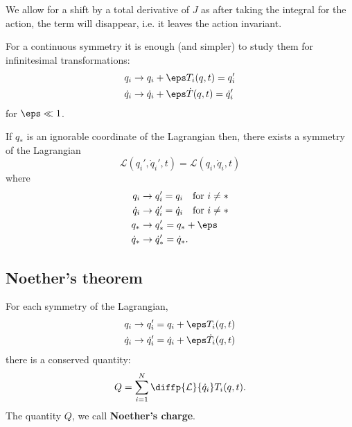 \documentclass[12pt, a4paper]{article}
\newcommand{\LL}{\mathcal L}
\begin{document}
\begin{mdremark}
    We allow for a shift by a total derivative of \(J\) as after taking the integral for the action, the term will disappear, i.e. it leaves the action invariant.
\end{mdremark}

\begin{proposition}
    For a continuous symmetry it is enough (and simpler) to study them for infinitesimal transformations:
    \[\begin{aligned}
        q_i &\to q_i +\eps T_i(q,t) =q'_i  \\
        \dot{q}_i &\to \dot{q}_i+\eps\dot{T}(q,t) =\dot{q}'_i
    \end{aligned}\]
    for \(\eps \ll 1\).
\end{proposition}

\begin{mdprop}
    If \(q_*\) is an ignorable coordinate of the Lagrangian then, there exists a symmetry of the Lagrangian 
    \[\LL(q_i',\dot{q}_i',t)=\LL(q_i,\dot{q}_i,t)\]
    where
    \[\begin{aligned}
        q_i &\to q_i' = q_i \quad \text{for } i\neq * \\
        \dot{q}_i &\to  \dot{q}'_i = \dot{q}_i \quad \text{for } i\neq* \\
        q_* &\to  q_*' =q_* + \eps \\
        \dot{q}_* &\to  \dot{q}_*' = \dot{q}_*.
    \end{aligned}\]
\end{mdprop}

\pagebreak

\subsection{Noether's theorem}

\begin{mdthm}
    For each symmetry of the Lagrangian, 
    \[\begin{aligned}
        q_i \to q'_i &= q_i + \eps T_i(q,t) \\
        \dot{q}_i \to \dot{q}'_i &= \dot{q}_i+\eps \dot{T}_i(q,t)
    \end{aligned}\]
    there is a conserved quantity:
    \[Q = \sum_{i=1}^{N} \diffp{\mathcal{L}}{{\dot{q}_i}} T_i(q,t).\]
    The quantity \(Q\), we call \textbf{Noether's charge}.
\end{mdthm}
\end{document}
